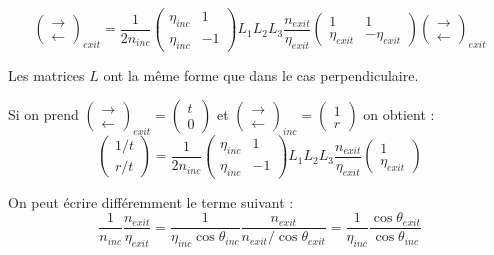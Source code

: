 \documentclass[a4paper,english]{article}
\begin{document}
\begin{dmath}
\begin{pmatrix}\rightarrow \\ \leftarrow\end{pmatrix}_{exit} =
\frac{1}{2 n_{inc}} \begin{pmatrix} \eta_{inc} & 1 \\ \eta_{inc} & -1 \end{pmatrix} L_1 L_2 L_3 \frac{n_{exit}}{\eta_{exit}} \begin{pmatrix} 1 & 1 \\ \eta_{exit} & -\eta_{exit} \end{pmatrix}
\begin{pmatrix}\rightarrow \\ \leftarrow\end{pmatrix}_{exit}
\end{dmath}

Les matrices $L$ ont la même forme que dans le cas perpendiculaire.

Si on prend $\begin{pmatrix}\rightarrow \\ \leftarrow\end{pmatrix}_{exit} = \begin{pmatrix}t \\ 0\end{pmatrix}$ et $\begin{pmatrix}\rightarrow \\ \leftarrow\end{pmatrix}_{inc} = \begin{pmatrix}1 \\ r\end{pmatrix}$ on obtient :
\begin{dmath}
\begin{pmatrix}1/t \\ r/t \end{pmatrix} = \frac{1}{2 n_{inc}} \begin{pmatrix} \eta_{inc} & 1 \\ \eta_{inc} & -1 \end{pmatrix} L_1 L_2 L_3 \frac{n_{exit}}{\eta_{exit}} \begin{pmatrix} 1 \\ \eta_{exit} \end{pmatrix}
\end{dmath}

On peut écrire différemment le terme suivant :
\begin{dmath}
\frac{1}{n_{inc}} \frac{n_{exit}}{\eta_{exit}} = \frac{1}{\eta_{inc} \cos \theta_{inc}} \frac{n_{exit}}{n_{exit} / \cos \theta_{exit}}
= \frac{1}{\eta_{inc}} \frac{\cos \theta_{exit}}{\cos \theta_{inc}}
\end{dmath}
\end{document}
